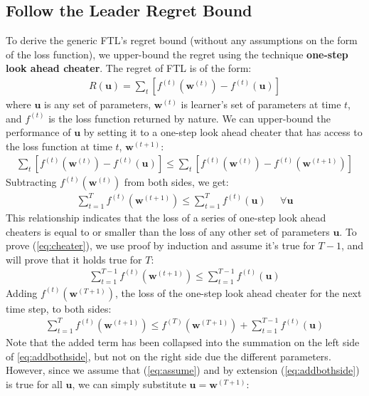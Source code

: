 \documentclass[11pt]{article}
\begin{document}
\subsection{Follow the Leader Regret Bound}
\label{sec:FTL}
To derive the generic FTL's regret bound (without any assumptions on the form of the loss function), we upper-bound the regret using the technique \textbf{one-step look ahead cheater}. The regret of FTL is of the form:
\begin{align}
    R(\boldsymbol{u})=\sum_t [f^{(t)}(\boldsymbol{w}^{(t)})-f^{(t)}(\boldsymbol{u})]
\end{align}
where $\boldsymbol{u}$ is any set of parameters, $\boldsymbol{w}^{(t)}$ is learner's set of parameters at time $t$, and $f^{(t)}$ is the loss function returned by nature. We can upper-bound the performance of $\boldsymbol{u}$ by setting it to a one-step look ahead cheater that has access to the loss function at time $t$, $\boldsymbol{w}^{(t+1)}$:
\begin{align}
\label{eq:propose}
    \sum_t [f^{(t)}(\boldsymbol{w}^{(t)})-f^{(t)}(\boldsymbol{u})] \leq \sum_{t}[f^{(t)}(\boldsymbol{w}^{(t)}) - f^{(t)}(\boldsymbol{w}^{(t+1)})]
\end{align}
Subtracting $f^{(t)}(\boldsymbol{w}^{(t)})$ from both sides, we get:
\begin{align}
     \sum_{t=1}^T f^{(t)}(\boldsymbol{w}^{(t+1)}) \leq     \sum_{t=1}^T f^{(t)}(\boldsymbol{u})\;\;\;\;\; \forall \boldsymbol{u}
         \label{eq:cheater}
\end{align}
This relationship indicates that the loss of a series of one-step look ahead cheaters is equal to or smaller than the loss of any other set of parameters $\boldsymbol{u}$. To prove (\ref{eq:cheater}), we use proof by induction and assume it's true for $T-1$, and will prove that it holds true for $T$:
\begin{align}
\label{eq:assume}
     \sum_{t=1}^{T-1} f^{(t)}(\boldsymbol{w}^{(t+1)}) \leq     \sum_{t=1}^{T-1} f^{(t)}(\boldsymbol{u})
\end{align}
Adding $f^{(t)}(\boldsymbol{w}^{(T+1)})$, the loss of the one-step look ahead cheater for the next time step, to both sides:
\begin{align}
\label{eq:addbothside}
    \sum_{t=1}^{T} f^{(t)} (\boldsymbol{w}^{(t+1)})\leq f^{(T)}(\boldsymbol{w}^{(T+1)}) +  \sum_{t=1}^{T-1} f^{(t)} (\boldsymbol{u})
\end{align}
Note that the added term has been collapsed into the summation on the left side of \ref{eq:addbothside}, but not on the right side due the different parameters. However, since we assume that (\ref{eq:assume}) and by extension (\ref{eq:addbothside}) is true for all $\boldsymbol{u}$, we can simply substitute $\boldsymbol{u}=\boldsymbol{w}^{(T+1)}$:
\end{document}
